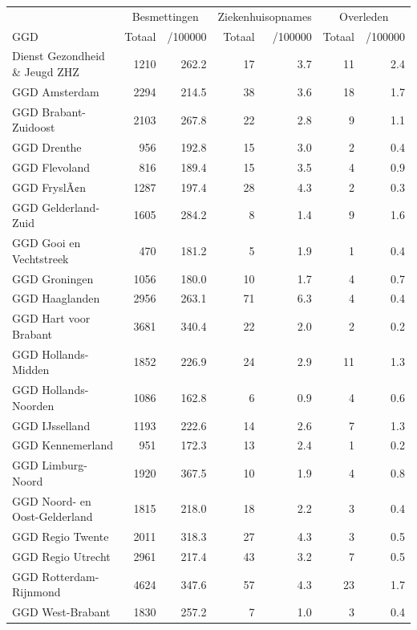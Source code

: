 \documentclass[
  english,
  man,floatsintext]{apa6}
\begin{document}
\begin{table}
\centering\begingroup\fontsize{10}{12}\selectfont

\begin{threeparttable}
\begin{tabular}{lrrrrrr}
\toprule
\multicolumn{1}{c}{ } & \multicolumn{2}{c}{Besmettingen} & \multicolumn{2}{c}{Ziekenhuisopnames} & \multicolumn{2}{c}{Overleden} \\
\cmidrule(l{3pt}r{3pt}){2-3} \cmidrule(l{3pt}r{3pt}){4-5} \cmidrule(l{3pt}r{3pt}){6-7}
GGD & Totaal & /100000 & Totaal & /100000 & Totaal & /100000\\
\midrule
Dienst Gezondheid \& Jeugd ZHZ & 1210 & 262.2 & 17 & 3.7 & 11 & 2.4\\
GGD Amsterdam & 2294 & 214.5 & 38 & 3.6 & 18 & 1.7\\
GGD Brabant-Zuidoost & 2103 & 267.8 & 22 & 2.8 & 9 & 1.1\\
GGD Drenthe & 956 & 192.8 & 15 & 3.0 & 2 & 0.4\\
GGD Flevoland & 816 & 189.4 & 15 & 3.5 & 4 & 0.9\\
GGD FryslÃ¢n & 1287 & 197.4 & 28 & 4.3 & 2 & 0.3\\
GGD Gelderland-Zuid & 1605 & 284.2 & 8 & 1.4 & 9 & 1.6\\
GGD Gooi en Vechtstreek & 470 & 181.2 & 5 & 1.9 & 1 & 0.4\\
GGD Groningen & 1056 & 180.0 & 10 & 1.7 & 4 & 0.7\\
GGD Haaglanden & 2956 & 263.1 & 71 & 6.3 & 4 & 0.4\\
GGD Hart voor Brabant & 3681 & 340.4 & 22 & 2.0 & 2 & 0.2\\
GGD Hollands-Midden & 1852 & 226.9 & 24 & 2.9 & 11 & 1.3\\
GGD Hollands-Noorden & 1086 & 162.8 & 6 & 0.9 & 4 & 0.6\\
GGD IJsselland & 1193 & 222.6 & 14 & 2.6 & 7 & 1.3\\
GGD Kennemerland & 951 & 172.3 & 13 & 2.4 & 1 & 0.2\\
GGD Limburg-Noord & 1920 & 367.5 & 10 & 1.9 & 4 & 0.8\\
GGD Noord- en Oost-Gelderland & 1815 & 218.0 & 18 & 2.2 & 3 & 0.4\\
GGD Regio Twente & 2011 & 318.3 & 27 & 4.3 & 3 & 0.5\\
GGD Regio Utrecht & 2961 & 217.4 & 43 & 3.2 & 7 & 0.5\\
GGD Rotterdam-Rijnmond & 4624 & 347.6 & 57 & 4.3 & 23 & 1.7\\
GGD West-Brabant & 1830 & 257.2 & 7 & 1.0 & 3 & 0.4\\

\end{tabular}
\end{threeparttable}
\end{table}
\end{document}
